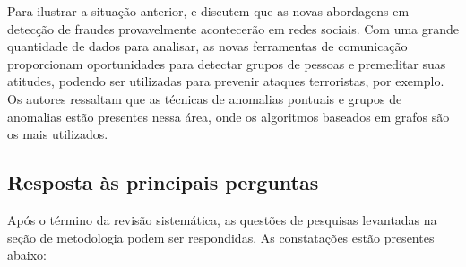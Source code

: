 \documentclass[smallextended]{svjour3}
\begin{document}
Para ilustrar a situação anterior, \cite{Liu2015} e \cite{Yu2016} discutem que as novas abordagens em detecção de fraudes provavelmente acontecerão em redes sociais. Com uma grande quantidade de dados para analisar, as novas ferramentas de comunicação proporcionam oportunidades para detectar grupos de pessoas e premeditar suas atitudes, podendo ser utilizadas para prevenir ataques terroristas, por exemplo. Os autores ressaltam que as técnicas de anomalias pontuais e grupos de anomalias estão presentes nessa área, onde os algoritmos baseados em grafos são os mais utilizados.


\subsection{Resposta às principais perguntas}

Após o término da revisão sistemática, as questões de pesquisas levantadas na seção de metodologia podem ser respondidas. As constatações estão presentes abaixo:
\end{document}
